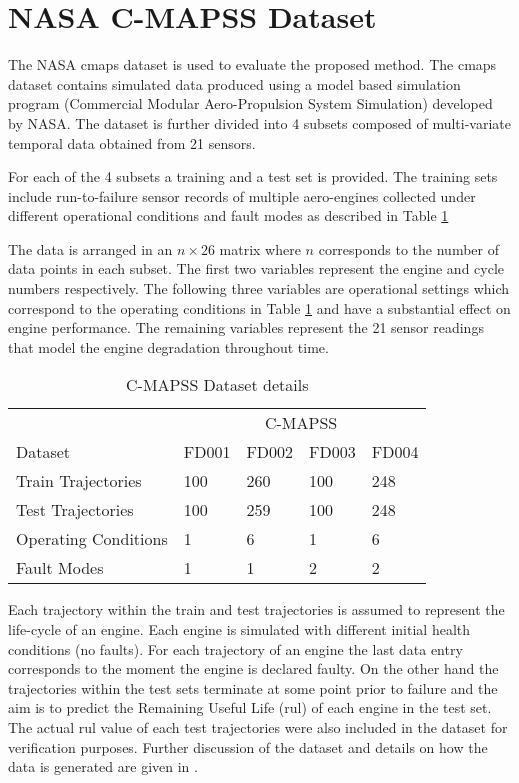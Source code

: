 \section{NASA C-MAPSS Dataset}
\label{sec:rul_dataset}

The NASA \gls{cmaps} dataset \cite{CMAPS2008} is used to evaluate the proposed method. The \gls{cmaps} dataset contains simulated data produced using a model based simulation program (Commercial Modular Aero-Propulsion System Simulation) developed by NASA. The dataset is further divided into 4 subsets composed of multi-variate temporal data obtained from 21 sensors.

For each of the 4 subsets a training and a test set is provided. The training sets include run-to-failure sensor records of multiple aero-engines collected under different operational conditions and fault modes as described in Table \ref{table:cmapss}

The data is arranged in an $n\times26$ matrix where $n$ corresponds to the number of data points in each subset. The first two variables represent the engine and cycle numbers respectively. The following three variables are operational settings which correspond to the operating conditions in Table \ref{table:cmapss} and have a substantial effect on engine performance. The remaining variables represent the 21 sensor readings that model the engine degradation throughout time.

\begin{table}[!htb]
\centering
\begin{tabular}{l | l l l l}
	\hline
	 & \multicolumn{4}{c}{C-MAPSS}\\  
	 Dataset & FD001 & FD002 & FD003 & FD004\\
  	\hline
  	Train Trajectories & 100 & 260 & 100 & 248\\
  	Test Trajectories & 100 & 259 & 100 & 248\\
  	Operating Conditions & 1 & 6 & 1 & 6\\
  	Fault Modes & 1 & 1 & 2 & 2\\
  	\hline
\end{tabular}
\caption{C-MAPSS Dataset details}
\label{table:cmapss}
\end{table}

Each trajectory within the train and test trajectories is assumed to represent the life-cycle of an engine. Each engine is simulated with different initial health conditions (no faults). For each trajectory of an engine the last data entry corresponds to the moment the engine is declared faulty. On the other hand the trajectories within the test sets terminate at some point prior to failure  and the aim is to predict the Remaining Useful Life (\gls{rul}) of each engine in the test set. The actual \gls{rul} value of each test trajectories were also included in the dataset for verification purposes. Further discussion of the dataset and details on how the data is generated are given in \cite{Saxena2008}.

